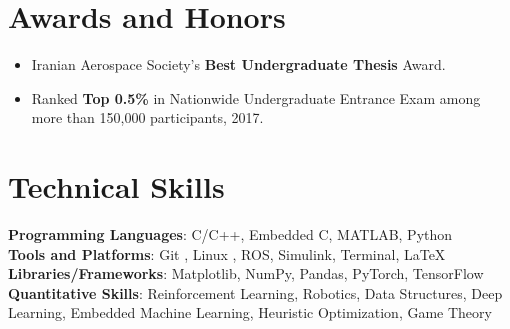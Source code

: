 \documentclass[letterpaper,11pt]{article}
\makeatletter
\newcommand{\resumeItem}[1]{
  \item\small{
    {#1 \vspace{-2pt}}
  }
}
\newcommand{\resumeSubheading}[4]{
  \vspace{-2pt}\item
    \begin{tabular*}{1.0\textwidth}[t]{l@{\extracolsep{\fill}}r}
      \textbf{ #1} & \textbf{\small #2} \\
      \textsl{\small #3} & \textit{\small #4} \\
    \end{tabular*}\vspace{-7pt}
}
\newcommand{\resumeSubHeadingListEnd}{\end{itemize}}
\newcommand{\resumeItemListStart}{\begin{itemize}}
\newcommand{\resumeItemListEnd}{\end{itemize}\vspace{-5pt}}
\makeatother
\begin{document}
 \section{Awards and Honors}
 \resumeItemListStart
 \resumeItem{Iranian Aerospace Society’s \textbf{Best Undergraduate Thesis} Award.}
 \vspace{-6pt}
 \resumeItem{Ranked \textbf{Top 0.5\%} in Nationwide Undergraduate Entrance Exam among more than 150,000 participants,
 	2017.}
 \resumeItemListEnd
 \vspace{-16pt}


%
\section{Technical Skills} %
 \begin{itemize}[leftmargin=0.15in, label={}]
 	\small{\item{
\textbf{Programming Languages}{: C/C++, Embedded C, MATLAB, Python \faPython} \\
\textbf{Tools and Platforms}{: Git \faGit*, Linux \faLinux, ROS, Simulink, \faTerminal  Terminal,  \LaTeX} \\
\textbf{Libraries/Frameworks}{: Matplotlib, NumPy, Pandas, PyTorch, TensorFlow} \\
\textbf{Quantitative Skills}{: Reinforcement Learning, Robotics, Data Structures, Deep Learning, Embedded Machine Learning, Heuristic Optimization, Game Theory}

 	}}
 \end{itemize}

 \vspace{-16pt}
\end{document}
